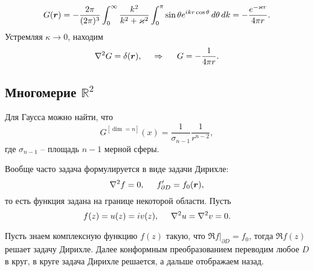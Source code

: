 \begin{equation*}
    G(\mbox{\boldmath $r$}) = - \frac{2 \pi}{(2 \pi)^3} \int_{0}^{\infty} \frac{k^2}{k^2 + \varkappa^2} \int_{0}^{\pi} 
    \sin \theta  e^{i k r \cos \theta}  \, d \theta \, d k = 
    - \frac{e^{- \varkappa r}}{4 \pi r}
    .
\end{equation*}
Устремляя $\kappa \to 0$, находим
\begin{equation*}
     \nabla^2 G = \delta(\mbox{\boldmath $r$}),
     \hspace{0.5cm} \Rightarrow \hspace{0.5cm}
     G = - \frac{1}{4 \pi r}.
 \end{equation*} 






\subsection*{Многомерие \texorpdfstring{$\mathbb{R}^2$}{R2}}

Для Гаусса можно найти, что
\begin{equation*}
    G^{[\dim = n]}(x) = \frac{1}{\sigma_{n-1}} \frac{1}{r^{n-2}},
\end{equation*}
где $\sigma_{n-1}$ -- площадь $n-1$ мерной сферы. 



Вообще часто задача формулируется в виде задачи Дирихле:
\begin{equation*}
    \nabla^2 f = 0, 
    \hspace{5 mm} 
    f'_{\partial D} = f_0 (\mbox{\boldmath $r$}),
\end{equation*}
то есть функция задана на границе некоторой области. Пусть
\begin{equation*}
    f(z) = u(z) = i v(z),
    \hspace{5 mm} 
    \nabla^2 u = \nabla^2 v = 0.
\end{equation*}

Пусть знаем комплексную функцию $f(z)$ такую, что $\Re f |_{\partial D} = f_0$, тогда $\Re f(z)$ решает задачу Дирихле.
Далее конформным преобразованием переводим любое $D$ в круг, в круге задача Дирихле решается, а дальше отображаем назад. 


